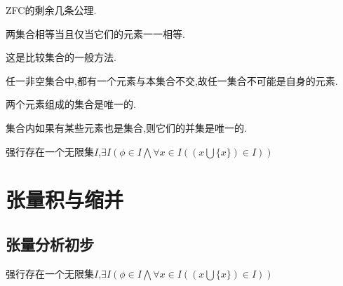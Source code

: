 ZFC的剩余几条公理.
\begin{axiom}
两集合相等当且仅当它们的元素一一相等.
\end{axiom}
\begin{remark}
  这是比较集合的一般方法.
\end{remark}
\begin{axiom}
  任一非空集合中,都有一个元素与本集合不交,故任一集合不可能是自身的元素.
\end{axiom}

\begin{axiom}
  两个元素组成的集合是唯一的.
\end{axiom}
\begin{axiom}
  集合内如果有某些元素也是集合,则它们的并集是唯一的.
\end{axiom}
\begin{axiom}
强行存在一个无限集$I$,$\exists I\left(\phi\in I\bigwedge\forall x\in I\left(\left(x\bigcup \{x\}\right)\in I\right)\right)$
\end{axiom}
\section{张量积与缩并}
\subsection{张量分析初步}
\begin{typicalbox}
  强行存在一个无限集$I$,$\exists I\left(\phi\in I\bigwedge\forall x\in I\left(\left(x\bigcup \{x\}\right)\in I\right)\right)$
\end{typicalbox}


